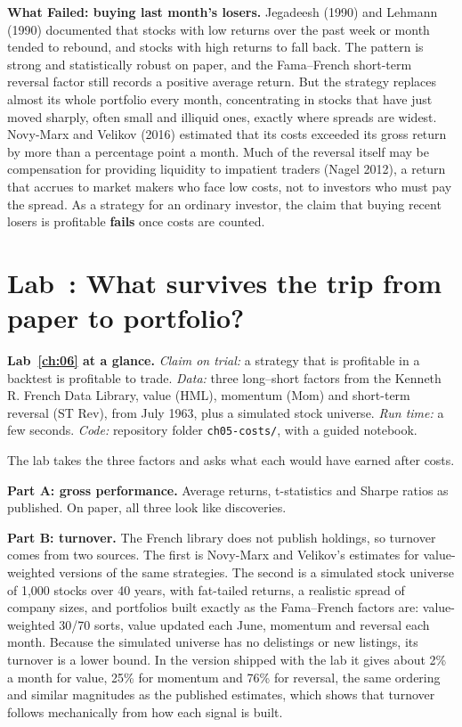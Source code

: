 \begin{callout}
\textbf{What Failed: buying last month's losers.} Jegadeesh (1990) and Lehmann (1990) documented that stocks with low returns over the past week or month tended to rebound, and stocks with high returns to fall back. The pattern is strong and statistically robust on paper, and the Fama--French short-term reversal factor still records a positive average return. But the strategy replaces almost its whole portfolio every month, concentrating in stocks that have just moved sharply, often small and illiquid ones, exactly where spreads are widest. Novy-Marx and Velikov (2016) estimated that its costs exceeded its gross return by more than a percentage point a month. Much of the reversal itself may be compensation for providing liquidity to impatient traders (Nagel 2012), a return that accrues to market makers who face low costs, not to investors who must pay the spread. As a strategy for an ordinary investor, the claim that buying recent losers is profitable \textbf{fails} once costs are counted.
\end{callout}

\section{Lab~\thechapter: What survives the trip from paper to portfolio?}
\label{sec:06-lab}

\begin{callout}
\textbf{Lab~\ref{ch:06} at a glance.} \emph{Claim on trial:} a strategy that is profitable in a backtest is profitable to trade. \emph{Data:} three long--short factors from the Kenneth R. French Data Library, value (HML), momentum (Mom) and short-term reversal (ST Rev), from July 1963, plus a simulated stock universe. \emph{Run time:} a few seconds. \emph{Code:} repository folder \texttt{ch05-costs/}, with a guided notebook.
\end{callout}

The lab takes the three factors and asks what each would have earned after costs.

\textbf{Part A: gross performance.} Average returns, t-statistics and Sharpe ratios as published. On paper, all three look like discoveries.

\textbf{Part B: turnover.} The French library does not publish holdings, so turnover comes from two sources. The first is Novy-Marx and Velikov's estimates for value-weighted versions of the same strategies. The second is a simulated stock universe of 1,000 stocks over 40 years, with fat-tailed returns, a realistic spread of company sizes, and portfolios built exactly as the Fama--French factors are: value-weighted 30/70 sorts, value updated each June, momentum and reversal each month. Because the simulated universe has no delistings or new listings, its turnover is a lower bound. In the version shipped with the lab it gives about 2\% a month for value, 25\% for momentum and 76\% for reversal, the same ordering and similar magnitudes as the published estimates, which shows that turnover follows mechanically from how each signal is built.

